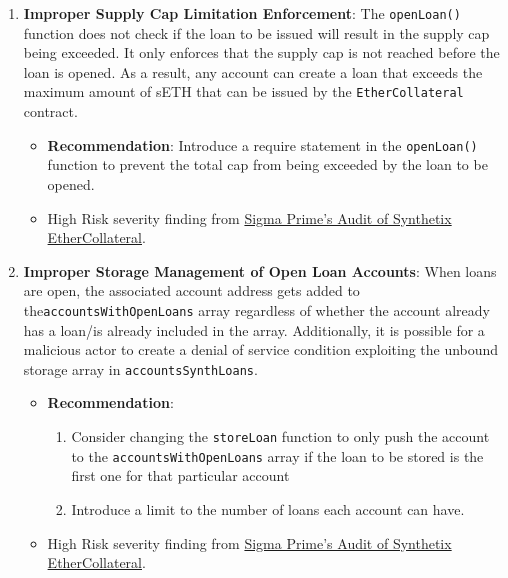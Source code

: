\begin{enumerate}
\item\textbf{Improper Supply Cap Limitation Enforcement}: The \verb|openLoan()| function does not check if the loan to be issued will result in the supply cap being exceeded. It only enforces that the supply cap is not reached before the loan is opened. As a result, any account can create a loan that exceeds the maximum amount of sETH that can be issued by the \verb|EtherCollateral| contract.
	\begin{itemize}
	\item\textbf{Recommendation}: Introduce a require statement in the \verb|openLoan()| function to prevent the total cap from being exceeded by the loan to be opened.
	\item High Risk severity finding from \href{https://github.com/sigp/public-audits/blob/master/synthetix/ethercollateral/review.pdf}{Sigma Prime's Audit of Synthetix EtherCollateral}.
	\end{itemize}

\item\textbf{Improper Storage Management of Open Loan Accounts}: When loans are open, the associated account address gets added to the\linebreak\verb|accountsWithOpenLoans| array regardless of whether the account already has a loan/is already included in the array. Additionally, it is possible for a malicious actor to create a denial of service condition exploiting the unbound storage array in \verb|accountsSynthLoans|.
	\begin{itemize}
	\item\textbf{Recommendation}:
	    \begin{enumerate}
	    \item Consider changing the \verb|storeLoan| function to only push the account to the \verb|accountsWithOpenLoans| array if the loan to be stored is the first one for that particular account
	    \item Introduce a limit to the number of loans each account can have.
	    \end{enumerate}
	\item High Risk severity finding from \href{https://github.com/sigp/public-audits/blob/master/synthetix/ethercollateral/review.pdf}{Sigma Prime's Audit of Synthetix EtherCollateral}.
	\end{itemize}


\end{enumerate}

